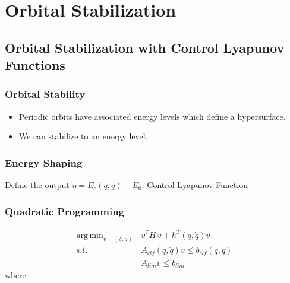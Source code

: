 \documentclass{beamer}
\newcommand{\showtoc}{
  \frame{
    \frametitle{Overview}
    \tableofcontents[sectionstyle=show/shaded,subsectionstyle=hide]
  }
}
\DeclareMathOperator*{\argmin}{arg\,min}
\begin{document}
\section{Orbital Stabilization}
\showtoc

\subsection{Orbital Stabilization with Control Lyapunov Functions}
\begin{frame}
  \frametitle{Orbital Stability}
  \begin{itemize}
  \item Periodic orbits have associated energy levels which define a hypersurface.
  \item We can stabilize to an energy level.
  \end{itemize}
\end{frame}


\begin{frame}
  \frametitle{Energy Shaping}
  Define the output $\eta = E_{c}(q, \dot q) - E_{0}$.
  Control Lyapunov Function
\end{frame}

\begin{frame}[t]
  \frametitle{Quadratic Programming}
  \begin{align}
    \nonumber
    \argmin_{v = (\delta, u)}  \, & v^T \! H \, v + h^T(q, \dot q) v\\
    \label{clf} \tag{clf}
    \mbox{s.t. } & A_{\mathit{clf}}(q, \dot q) v \leq b_{\mathit{clf}}(q, \dot q)\\
    \label{lim} \tag{lim}
    & A_{\mathit{lim}} v \leq b_{\mathit{lim}}
  \end{align}
  where
\end{frame}
\end{document}

